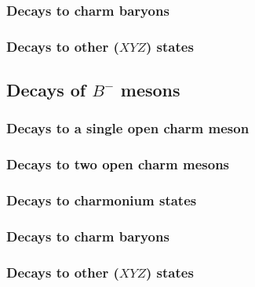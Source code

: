 \subsubsection{Decays to charm baryons}

\subsubsection{Decays to other ($XYZ$) states}


\subsection{Decays of $B^-$ mesons}

\subsubsection{Decays to a single open charm meson}

\subsubsection{Decays to two open charm mesons}

\subsubsection{Decays to charmonium states}

\subsubsection{Decays to charm baryons}

\subsubsection{Decays to other ($XYZ$) states}


